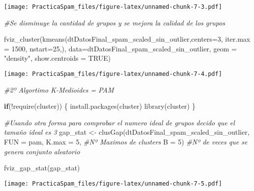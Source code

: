 \documentclass[
]{article}
\newenvironment{Shaded}{\begin{snugshade}}{\end{snugshade}}
\newcommand{\AttributeTok}[1]{\textcolor[rgb]{0.77,0.63,0.00}{#1}}
\newcommand{\CommentTok}[1]{\textcolor[rgb]{0.56,0.35,0.01}{\textit{#1}}}
\newcommand{\ConstantTok}[1]{\textcolor[rgb]{0.00,0.00,0.00}{#1}}
\newcommand{\ControlFlowTok}[1]{\textcolor[rgb]{0.13,0.29,0.53}{\textbf{#1}}}
\newcommand{\DecValTok}[1]{\textcolor[rgb]{0.00,0.00,0.81}{#1}}
\newcommand{\FunctionTok}[1]{\textcolor[rgb]{0.00,0.00,0.00}{#1}}
\newcommand{\NormalTok}[1]{#1}
\newcommand{\OtherTok}[1]{\textcolor[rgb]{0.56,0.35,0.01}{#1}}
\newcommand{\SpecialCharTok}[1]{\textcolor[rgb]{0.00,0.00,0.00}{#1}}
\newcommand{\StringTok}[1]{\textcolor[rgb]{0.31,0.60,0.02}{#1}}
\begin{document}
\texttt{[image: PracticaSpam\_files/figure-latex/unnamed-chunk-7-3.pdf]}

\begin{Shaded}
\begin{Highlighting}[]
  \CommentTok{\#Se disminuye la cantidad de grupos y se mejora la calidad de los grupos}
  
  \FunctionTok{fviz\_cluster}\NormalTok{(}\FunctionTok{kmeans}\NormalTok{(dtDatosFinal\_spam\_scaled\_sin\_outlier,}\AttributeTok{centers=}\DecValTok{3}\NormalTok{, }\AttributeTok{iter.max =} \DecValTok{1500}\NormalTok{, }\AttributeTok{nstart=}\DecValTok{25}\NormalTok{,), }\AttributeTok{data=}\NormalTok{dtDatosFinal\_spam\_scaled\_sin\_outlier, }\AttributeTok{geom =} \StringTok{"density"}\NormalTok{,}
             \AttributeTok{show.centroids =} \ConstantTok{TRUE}\NormalTok{)}
\end{Highlighting}
\end{Shaded}

\texttt{[image: PracticaSpam\_files/figure-latex/unnamed-chunk-7-4.pdf]}

\begin{Shaded}
\begin{Highlighting}[]
  \CommentTok{\#2º Algortimo K{-}Medioides = PAM}
  
  \ControlFlowTok{if}\NormalTok{(}\SpecialCharTok{!}\FunctionTok{require}\NormalTok{(}\StringTok{\textquotesingle{}cluster\textquotesingle{}}\NormalTok{)) \{}
    \FunctionTok{install.packages}\NormalTok{(}\StringTok{\textquotesingle{}cluster\textquotesingle{}}\NormalTok{)}
    \FunctionTok{library}\NormalTok{(}\StringTok{\textquotesingle{}cluster\textquotesingle{}}\NormalTok{)}
\NormalTok{  \}}
  
  \CommentTok{\#Usando otra forma para comprobar el numero ideal de grupos decido que el tamaño ideal es 3}
\NormalTok{  gap\_stat }\OtherTok{\textless{}{-}} \FunctionTok{clusGap}\NormalTok{(dtDatosFinal\_spam\_scaled\_sin\_outlier,}
                    \AttributeTok{FUN =}\NormalTok{ pam,}
                    \AttributeTok{K.max =} \DecValTok{5}\NormalTok{, }\CommentTok{\#Nº Maximos de clusters}
                    \AttributeTok{B =} \DecValTok{5}\NormalTok{) }\CommentTok{\#Nº de veces que se genera conjunto aleatorio}

  \FunctionTok{fviz\_gap\_stat}\NormalTok{(gap\_stat)}
\end{Highlighting}
\end{Shaded}

\texttt{[image: PracticaSpam\_files/figure-latex/unnamed-chunk-7-5.pdf]}
\end{document}
